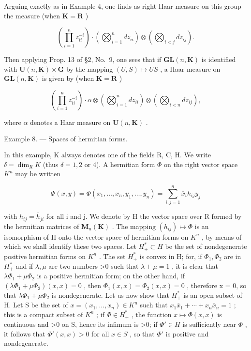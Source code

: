 Arguing exactly as in Example 4, one finds as right Haar measure on this group the measure (when \(\mathbf{K} = \mathbf{R}\) )

\[
\left(\prod_ {i = 1} ^ {n} z _ {i i} ^ {- i}\right) \cdot \left(\bigotimes_ {i = 1} ^ {n} d z _ {i i}\right) \otimes \left(\bigotimes_ {i <   j} d z _ {i j}\right).
\]

Then applying Prop. 13 of §2, No.~9, one sees that if \(\mathbf{GL}(n,\mathbf{K})\) is identified with \(\mathbf{U}(n,\mathbf{K})\times\mathbf{G}\) by the mapping \((U,S)\mapsto US\) , a Haar measure on \(\mathbf{GL}(n,\mathbf{K})\) is given by (when \(\mathbf{K}=\mathbf{R}\) )

\[
\left(\prod_ {i = 1} ^ {n} z _ {i i} ^ {- i}\right) \cdot \alpha \otimes \left(\bigotimes_ {i = 1} ^ {n} d z _ {i i}\right) \otimes \left(\bigotimes_ {i <   n} d z _ {i j}\right),\tag{14}
\]

where \(\alpha\) denotes a Haar measure on \(\mathbf{U}(n,\mathbf{K})\) .

Example 8. --- Spaces of hermitian forms.

In this example, K always denotes one of the fields R, C, H. We write \(\delta = \dim_{R} K\) (thus \(\delta = 1, 2\) or 4). A hermitian form \(\Phi\) on the right vector space \(K^{n}\) may be written

\[
\Phi (x, y) = \Phi (x _ {1}, \dots , x _ {n}, y _ {1}, \dots , y _ {n}) = \sum_ {i, j = 1} ^ {n} \overline {{{{x}}}} _ {i} h _ {i j} y _ {j}
\]

with \(h_{ij} = \overline{h}_{ji}\) for all i and j. We denote by H the vector space over R formed by the hermitian matrices of \(\mathbf{M}_{n}(\mathbf{K})\) . The mapping \((h_{ij}) \mapsto \Phi\) is an isomorphism of H onto the vector space of hermitian forms on \(K^{n}\) , by means of which we shall identify these two spaces. Let \(H_{+}^{*} \subset H\) be the set of nondegenerate positive hermitian forms on \(K^{n}\) . The set \(H_{+}^{*}\) is convex in H; for, if \(\Phi_{1}, \Phi_{2}\) are in \(H_{+}^{*}\) and if \(\lambda, \mu\) are two numbers \textgreater0 such that \(\lambda + \mu = 1\) , it is clear that \(\lambda \Phi_{1} + \mu \Phi_{2}\) is a positive hermitian form; on the other hand, if \((\lambda \Phi_{1} + \mu \Phi_{2})(x, x) = 0\) , then \(\Phi_{1}(x, x) = \Phi_{2}(x, x) = 0\) , therefore x = 0, so that \(\lambda \Phi_{1} + \mu \Phi_{2}\) is nondegenerate. Let us now show that \(H_{+}^{*}\) is an open subset of H. Let S be the set of \(x = (x_{1}, \ldots, x_{n}) \in K^{n}\) such that \(x_{1} \overline{x}_{1} + \cdots + x_{n} \overline{x}_{n} = 1\) ; this is a compact subset of \(K^{n}\) ; if \(\Phi \in H_{+}^{*}\) , the function \(x \mapsto \Phi(x, x)\) is continuous and \textgreater0 on S, hence its infimum is \textgreater0; if \(\Phi' \in H\) is sufficiently near \(\Phi\) , it follows that \(\Phi'(x, x) > 0\) for all \(x \in S\) , so that \(\Phi'\) is positive and nondegenerate.

